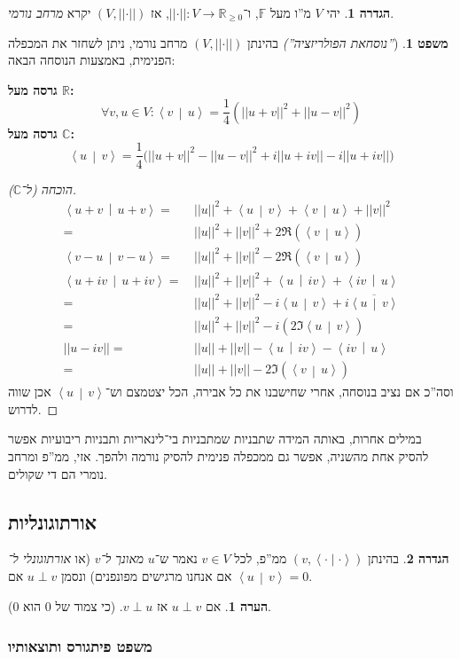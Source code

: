 \documentclass[a4paper]{article}
\newcommand\R     {\mathbb{R}}
\newcommand\C     {\mathbb{C}}
\newcommand\ra    {\rangle}
\newcommand\la    {\langle}
\newcommand\ol    {\overline}
\newcommand\F         {\mathbb{F}}
\newcommand\co        {\colon}
\newcommand\norm[1]   {\left \vert \left \vert #1 \right \vert \right \vert}
\newcommand\snorm     {\left \vert \left \vert \cdot \right \vert \right \vert}
\newcommand\smut      {\left \la \cdot \mid \cdot \right \ra}
\newcommand\mut [2]   {\left \la #1 \,\middle|\, #2 \right \ra}
\theoremstyle{definition}
\newtheorem{Theorem}{\color{myblue}משפט}
\newtheorem{Definition}{\color{mygreen}הגדרה}
\newtheorem{Remark}{\color{mycyan}הערה}
\newcommand\theo  [1] {\begin{Theorem}#1\end{Theorem}}
\newcommand\defi  [1] {\begin{Definition}#1\end{Definition}}
\newcommand\rmark [1] {\begin{Remark}#1\end{Remark}}
\begin{document}
	\defi{יהי $V$ מ''ו מעל $\F$, ו־$\snorm \co V \to \R_{\ge 0}$, אז $(V, \snorm)$ יקרא \textit{מרחב נורמי}. }
	\theo{(\textit{''נוסחאת הפולריזציה'')} בהינתן $(V, \snorm)$ מרחב נורמי, ניתן לשחזר את המכפלה הפנימית, באמצעות הנוסחה הבאה: 
		
		\textbf{גרסה מעל $\bm{\R}$: }
		\[ \forall v, u \in V \co \mut{v}{u} = \frac{1}{4}(\norm{u + v}^2 + \norm{u - v}^2) \]
		\textbf{גרסה מעל $\C$: }
		\[ \mut{u}{v} = \frac{1}{4}\Big(\norm{u + v}^2 - \norm{u - v}^2 + i\norm{u + iv} - i\norm{u + iv}\Big) \]
	}
	\begin{proof}[הוכחה (ל־$\bm{\C}$)]
		\begin{align*}
			\mut{u + v}{u + v} =\,& \norm{u}^2 + \mut{u}{v} + \mut{v}{u} + \norm{v}^2 \\
			=\,& \norm{u}^2 + \norm{v}^2 + 2\Re(\mut{v}{u}) \\
			\mut{v - u}{v - u} = \, & \norm{u}^2 + \norm{v}^2 - 2\Re(\mut{v}{u}) \\
			\mut{u + iv}{u + iv} =\,& \norm{u}^2 + \norm{v}^2 + \mut{u}{iv} + \mut{iv}{u}  \\
			=\,& \norm{u}^2 + \norm{v}^2 - i\mut{u}{v} + i\ol{\mut{u}{v}} \\
			=\,& \norm{u}^2 + \norm{v}^2 - i(2 \Im\mut{u}{v}) \\
			\norm{u - iv} =\,& \norm{u} + \norm{v} - \mut{u}{iv} - \mut{iv}{u} \\
			=\,& \norm{u} + \norm{v} - 2\Im(\mut{v}{u})
		\end{align*}
		וסה''כ אם נציב בנוסחה, אחרי שחישבנו את כל אבירה, הכל יצטמצם וש־$\mut{u}{v}$ אכן שווה לדרוש. 
	\end{proof}
	
	במילים אחרות, באותה המידה שתבניות שמתבניות בי־לינאריות ותבניות ריבועיות אפשר להסיק אחת מהשניה, אפשר גם ממכפלה פנימית להסיק נורמה ולהפך. אזי, ממ''פ ומרחב נומרי הם די שקולים. 
	
	\subsection{אורתוגונליות}
	
	\defi{בהינתן $(v, \smut)$ ממ''פ, לכל $v \in V$ נאמר ש־$u$ \textit{מאונך ל־$v$} (או \textit{אורתוגונלי ל־} אם אנחנו מרגישים מפונפנים) ונסמן $u\perp v$ אם $\mut{u}{v} = 0$. }
	
	\rmark{אם $u \perp v$ אז $v \perp u$. (כי צמוד של $0$ הוא $0$). }
	
	\subsubsection{משפט פיתגורס ותוצאותיו}
	
\end{document}
